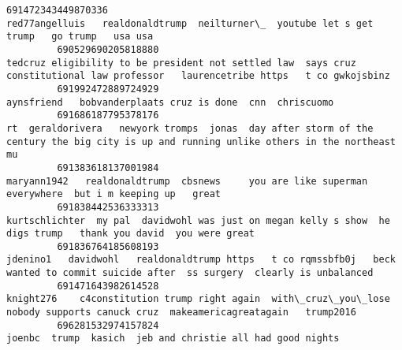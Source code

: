 \documentclass[11pt]{article}
\begin{document}
\begin{Verbatim}[commandchars=\\\{\}]
         691472343449870336                                                                                                                                                                                             red77angelluis   realdonaldtrump  neilturner\_  youtube let s get trump   go trump   usa usa     
         690529690205818880                                                                                                                                                     tedcruz eligibility to be president not settled law  says cruz  constitutional law professor   laurencetribe https   t co gwkojsbinz    
         691992472889724929                                                                                                                                                                                                                               aynsfriend   bobvanderplaats cruz is done  cnn  chriscuomo    
         691686187795378176                                                                                                                                              rt  geraldorivera   newyork tromps  jonas  day after storm of the century the big city is up and running unlike others in the northeast  mu    
         691383618137001984                                                                                                                                                                                 maryann1942   realdonaldtrump  cbsnews     you are like superman  everywhere  but i m keeping up   great    
         691838442536333313                                                                                                                                                                        kurtschlichter  my pal  davidwohl was just on megan kelly s show  he digs trump   thank you david  you were great    
         691836764185608193                                                                                                                                                 jdenino1   davidwohl   realdonaldtrump https   t co rqmssbfb0j   beck wanted to commit suicide after  ss surgery  clearly is unbalanced     
         691471643982614528                                                                                                                                                         knight276    c4constitution trump right again  with\_cruz\_you\_lose  nobody supports canuck cruz  makeamericagreatagain   trump2016   
         696281532974157824                                                                                                                                                                                                                             joenbc  trump  kasich  jeb and christie all had good nights     

\end{Verbatim}
\end{document}
